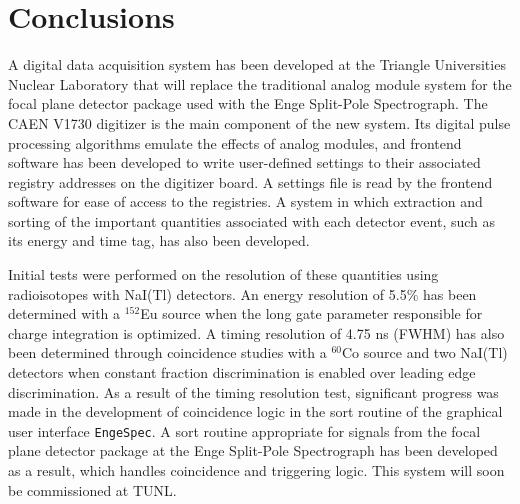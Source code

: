 \section{Conclusions}

A digital data acquisition system has been developed at the Triangle Universities Nuclear Laboratory that will replace the traditional analog module system for the focal plane detector package used with the Enge Split-Pole Spectrograph. The CAEN V1730 digitizer is the main component of the new system. Its digital pulse processing algorithms emulate the effects of analog modules, and frontend software has been developed to write user-defined settings to their associated registry addresses on the digitizer board. A settings file is read by the frontend software for ease of access to the registries. A system in which extraction and sorting of the important quantities associated with each detector event, such as its energy and time tag, has also been developed.

Initial tests were performed on the resolution of these quantities using radioisotopes with NaI(Tl) detectors. An energy resolution of 5.5$\%$ has been determined with a $^{152}$Eu source when the long gate parameter responsible for charge integration is optimized. A timing resolution of 4.75 ns (FWHM) has also been determined through coincidence studies with a $^{60}$Co source and two NaI(Tl) detectors when constant fraction discrimination is enabled over leading edge discrimination. As a result of the timing resolution test, significant progress was made in the development of coincidence logic in the sort routine of the graphical user interface \texttt{EngeSpec}. A sort routine appropriate for signals from the focal plane detector package at the Enge Split-Pole Spectrograph has been developed as a result, which handles coincidence and triggering logic. This system will soon be commissioned at TUNL.